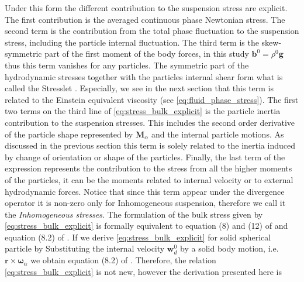 Under this form the different contribution to the suspension stress are explicit. 
The first contribution is the averaged continuous phase Newtonian stress. 
The second term is the  contribution from the total phase fluctuation to the suspension stress, including the particle internal fluctuation. 
The third term is the skew-symmetric part of the first moment of the body forces, in this study $\textbf{b}^0 = \rho^0 \textbf{g}$ thus this term vanishes for any particles. 
The symmetric part of the hydrodynamic stresses together with the particles internal shear form what is called the Stresslet \citep{pozrikidis1992boundary}. 
Especially, we see in the next section that this term is related to the Einstein equivalent viscosity (see \ref{eq:fluid_phase_stress}). 
The first two terms on the third line of \ref{eq:stress_bulk_explicit} is the particle inertia contribution to the suspension stresses. 
This includes the second order derivative of the particle shape represented by $\textbf{M}_\alpha$ and the internal particle motions. 
As discussed in the previous section this term is solely related to the inertia induced by change of orientation or shape of the particles. 
Finally, the last term of the expression represents the contribution to the stress from all the higher moments of the particles, it can be the moments related to internal velocity or to external hydrodynamic forces.  
Notice that since this term appear under the divergence operator it is non-zero only for Inhomogeneous suspension, therefore we call it the \textit{Inhomogeneous stresses}. 
The formulation of the bulk stress given by \ref{eq:stress_bulk_explicit} is formally equivalent to equation (8) and (12) of \citet{lhuillier1996contribution} and equation (8.2) of \citet{zhang1997momentum}.
If we derive \ref{eq:stress_bulk_explicit} for solid spherical particle by Substituting the internal velocity $\textbf{w}_d^0$ by a solid body motion, i.e. $\textbf{r}\times\bm\omega_\alpha$ we obtain equation (8.2) of \citet{zhang1997momentum}. 
Therefore, the relation \ref{eq:stress_bulk_explicit} is not new, however the derivation presented here is 


